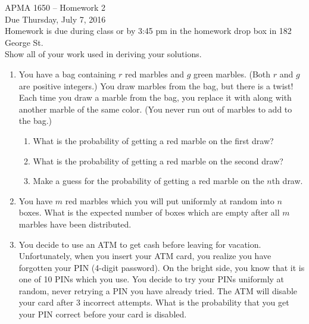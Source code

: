 \documentclass[12pt]{article}
\begin{document}
\title{}
\author{\vspace{-10ex} }

\begin{center}
{\LARGE APMA 1650 -- Homework 2}\\
\vspace{5mm}
{\large Due Thursday, July 7, 2016}\\
\vspace{5mm}
Homework is due during class or by 3:45 pm in the homework drop box in 182 George St.\\
Show all of your work used in deriving your solutions.
\end{center}

\begin{enumerate}

\item You have a bag containing $r$ red marbles and $g$ green marbles. (Both $r$ and $g$ are positive integers.) You draw marbles from the bag, but there is a twist! Each time you draw a marble from the bag, you replace it with along with another marble of the same color. (You never run out of marbles to add to the bag.)
\begin{enumerate}
\item What is the probability of getting a red marble on the first draw?
\item What is the probability of getting a red marble on the second draw?
\item Make a guess for the probability of getting a red marble on the $n$th draw.
\end{enumerate}

\item You have $m$ red marbles which you will put uniformly at random into $n$ boxes. What is the expected number of boxes which are empty after all $m$ marbles have been distributed.

\item You decide to use an ATM to get cash before leaving for vacation. Unfortunately, when you insert your ATM card, you realize you have forgotten your PIN (4-digit password). On the bright side, you know that it is one of 10 PINs which you use. You decide to try your PINs uniformly at random, never retrying a PIN you have already tried. The ATM will disable your card after 3 incorrect attempts. What is the probability that you get your PIN correct before your card is disabled.


\end{enumerate}
\end{document}
